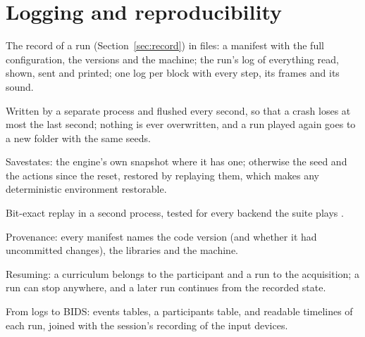 \section{Logging and reproducibility}
\label{sec:logging}

\begin{outline}
  \item The record of a run (Section~\ref{sec:record}) in files: a manifest with the full configuration, the versions and the machine; the run's log of everything read, shown, sent and printed; one log per block with every step, its frames and its sound.
  \item Written by a separate process and flushed every second, so that a crash loses at most the last second; nothing is ever overwritten, and a run played again goes to a new folder with the same seeds.
  \item Savestates: the engine's own snapshot where it has one; otherwise the seed and the actions since the reset, restored by replaying them, which makes any deterministic environment restorable.
  \item Bit-exact replay in a second process, tested for every backend the suite plays .
  \item Provenance: every manifest names the code version (and whether it had uncommitted changes), the libraries and the machine.
  \item Resuming: a curriculum belongs to the participant and a run to the acquisition; a run can stop anywhere, and a later run continues from the recorded state.
  \item From logs to BIDS: events tables, a participants table, and readable timelines of each run, joined with the session's recording of the input devices.
\end{outline}
